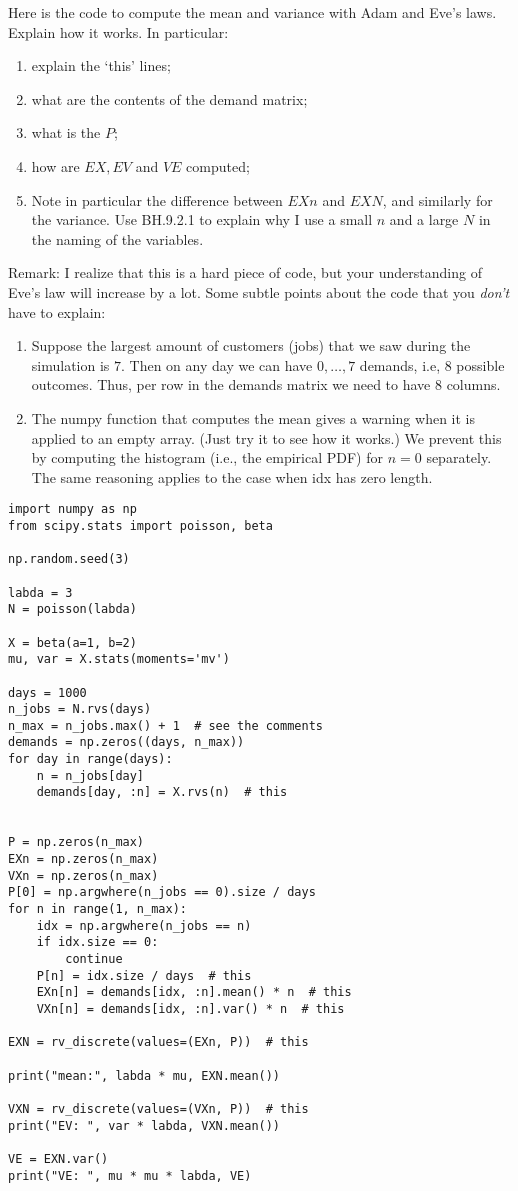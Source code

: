 \begin{exercise}
Here is the code to compute the mean and variance with Adam and Eve's laws. Explain how it works. In particular:
\begin{enumerate}
\item explain the `this' lines;
\item what are the contents of the demand matrix;
\item what is the $P$;
\item  how are $EX, EV$ and $VE$  computed;
\item Note in particular the difference between $EXn$ and $EXN$, and similarly for the variance.  Use BH.9.2.1 to explain why I use a small $n$ and a large $N$ in the naming of the variables.
\end{enumerate}

Remark: I realize that this is a hard piece of code, but your understanding of Eve's law will increase by a lot. Some  subtle points about the code that you \emph{don't} have to explain:
\begin{enumerate}
\item Suppose the largest amount of customers (jobs) that we saw during the simulation is $7$. Then on any day we can have $0, \ldots, 7$ demands, i.e, 8 possible outcomes. Thus, per row in the demands matrix we need to have 8 columns.
\item The numpy function that computes the mean gives a warning when it is applied to an empty array. (Just try it to see how it works.)  We prevent this by computing the histogram (i.e., the empirical PDF) for $n=0$ separately. The same reasoning applies to the case when idx has zero length.
\end{enumerate}


\begin{verbatim}
import numpy as np
from scipy.stats import poisson, beta

np.random.seed(3)

labda = 3
N = poisson(labda)

X = beta(a=1, b=2)
mu, var = X.stats(moments='mv')

days = 1000
n_jobs = N.rvs(days)
n_max = n_jobs.max() + 1  # see the comments
demands = np.zeros((days, n_max))
for day in range(days):
    n = n_jobs[day]
    demands[day, :n] = X.rvs(n)  # this


P = np.zeros(n_max)
EXn = np.zeros(n_max)
VXn = np.zeros(n_max)
P[0] = np.argwhere(n_jobs == 0).size / days
for n in range(1, n_max):
    idx = np.argwhere(n_jobs == n)
    if idx.size == 0:
        continue
    P[n] = idx.size / days  # this
    EXn[n] = demands[idx, :n].mean() * n  # this
    VXn[n] = demands[idx, :n].var() * n  # this

EXN = rv_discrete(values=(EXn, P))  # this

print("mean:", labda * mu, EXN.mean())

VXN = rv_discrete(values=(VXn, P))  # this
print("EV: ", var * labda, VXN.mean())

VE = EXN.var()
print("VE: ", mu * mu * labda, VE)
\end{verbatim}
\end{exercise}


